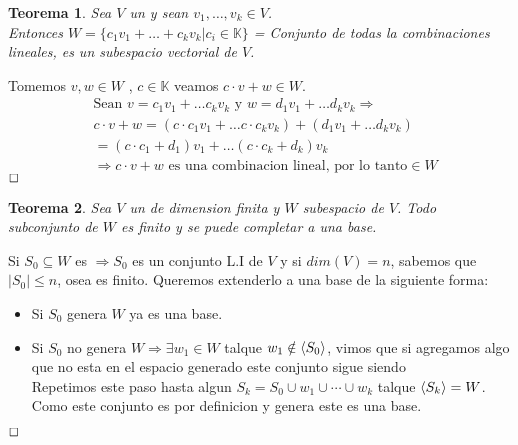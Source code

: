 \documentclass[]{article}
\newtheorem{theorem}{Teorema}
\newenvironment{proof}{\noindent{\bf Prueba:}}{$\hfill \Box$ \vspace{10pt}}
\newcommand{\kk}{
    \mathbb{K}
}
\newcommand{\ida}{\Longrightarrow}
\begin{document}
\begin{theorem}
    Sea $V$ un \espvec y sean $v_1, \dots , v_k \in V$.\\
    Entonces $W=\{ c_1v_1+ \dots + c_kv_k | c_i \in \kk\}$ = Conjunto de todas la combinaciones lineales,
    es un subespacio vectorial de $V$.
\end{theorem}
\begin{proof}
    Tomemos $v,w \in W$ , $c \in \kk$ veamos $c \cdot v + w \in W$.
    \begin{align*}
        &\text{Sean } v= c_1v_1+ \dots c_kv_k \text{ y } w = d_1v_1 + \dots d_kv_k \ida \\
        &c \cdot v + w = (c \cdot c_1v_1+ \dots c \cdot c_kv_k) + (d_1v_1 + \dots d_kv_k)\\
        &= (c \cdot c_1 + d_1)v_1 + \dots (c \cdot c_k + d_k)v_k \\
        &\ida c \cdot v + w \text{ es una combinacion lineal, por lo tanto} \in W
    \end{align*}
\end{proof}

\begin{theorem}
    Sea $V$ un \espvec de dimension finita y $W$ subespacio de $V$. Todo subconjunto \li de $W$ es
    finito y se puede completar a una base. 
\end{theorem}
\begin{proof}
    Si $S_0 \subseteq W$ es \li $\ida S_0$ es un conjunto L.I de $V$ y si $dim(V)=n$, sabemos que $|S_0|\leq n$,
    osea es finito. Queremos extenderlo a una base de la siguiente forma:
    \begin{itemize}
        \item Si $S_0$ genera $W$ ya es una base.
        \item Si $S_0$ no genera $W \ida \exists w_1 \in W$ talque $w_1 \notin \langle S_0 \rangle$, vimos que si
        agregamos algo que no esta en el espacio generado este conjunto sigue siendo \li\\
        Repetimos este paso hasta algun $S_k = S_0 \cup w_1 \cup \cdots \cup w_k$ talque $\langle S_k \rangle = W$.
        Como este conjunto es por definicion \li y genera este es una base.  
    \end{itemize}
\end{proof}
\end{document}
